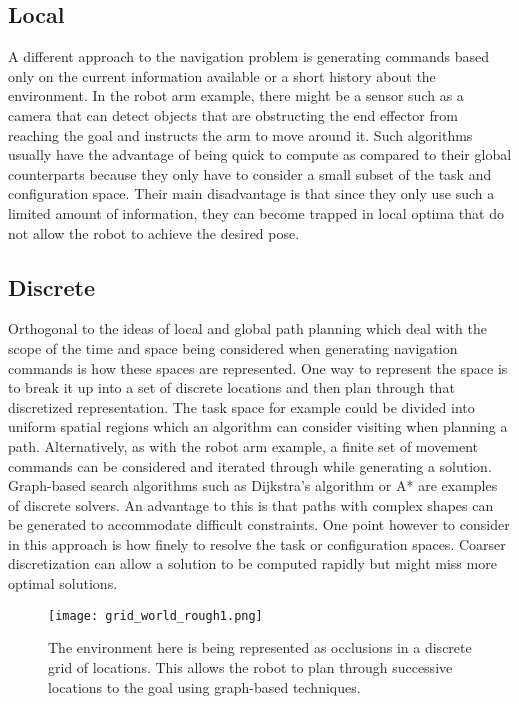 \subsection{Local}
A different approach to the navigation problem is generating commands based only on the current information available 
or a short history about the environment. In the robot arm example, there might be a sensor such as a camera that
can detect objects that are obstructing the end effector from reaching the goal and instructs the arm to move around it.
Such algorithms usually have the advantage of being quick to compute as compared to their global counterparts because
they only have to consider a small subset of the task and configuration space. Their main disadvantage is that since they
only use such a limited amount of information, they can become trapped in local optima that do not allow the robot 
to achieve the desired pose.

\subsection{Discrete}
Orthogonal to the ideas of local and global path planning which deal with the scope of the time and space being considered
when generating navigation commands is how these spaces are represented. One way to represent the space is to break it
up into a set of discrete locations and then plan through that discretized representation. The task space for example could be divided into uniform 
spatial regions which an algorithm can consider visiting when planning a path. Alternatively, as with the robot arm example,
a finite set of movement commands can be considered and iterated through while generating a solution. 
Graph-based search algorithms such as  Dijkstra's algorithm or A* are examples of discrete solvers.
An advantage to this is that paths with complex shapes can be generated to accommodate difficult constraints. 
One point however to consider in this approach is how finely to resolve the task or configuration spaces. 
Coarser discretization can allow a solution to be computed rapidly but might miss more optimal solutions. 
\begin{figure}
	\centering
	\texttt{[image: grid\_world\_rough1.png]}
	\caption
	{The environment here is being represented as occlusions in a discrete grid of locations.
	This allows the robot to plan through successive locations to the goal using graph-based techniques.}
	\label{fig:grid_world1}
\end{figure}

